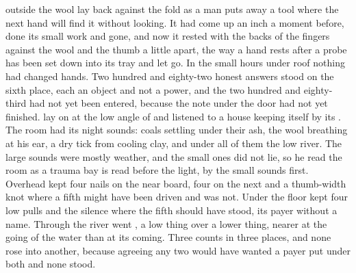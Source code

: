 
 outside the wool lay back against the fold as a man puts away a tool where the next hand will find it without looking. It had come up an inch a moment before, done its small work and gone, and now it rested with the backs of the fingers against the wool and the thumb a little apart, the way a hand rests after a probe has been set down into its tray and let go. In the small hours under  roof nothing had changed hands. Two hundred and eighty-two honest answers stood on the sixth place, each an object and not a power, and the two hundred and eighty-third had not yet been entered, because the note under the door had not yet finished.  lay on  at the low angle of  and listened to a house keeping itself by its . The room had its night sounds: coals settling under their ash, the wool breathing at his ear, a dry tick from cooling clay, and under all of them the low river. The large sounds were mostly weather, and the small ones did not lie, so he read the room as a trauma bay is read before the light, by the small sounds first. Overhead  kept four nails on the near board, four on the next and a thumb-width knot where a fifth might have been driven and was not. Under the floor  kept four low pulls and the silence where the fifth should have stood, its payer without a name. Through  the river went , a low thing over a lower thing, nearer at the going of the water than at its coming. Three counts in three places, and none rose into another, because agreeing any two would have wanted a payer put under both and none stood.


